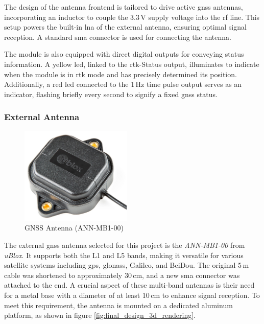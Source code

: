 The design of the antenna frontend is tailored to drive active \acrshort{gnss} antennas, incorporating an inductor to couple the 3.3\,V supply voltage into the \acrshort{rf} line.
This setup powers the built-in \acrshort{lna} of the external antenna, ensuring optimal signal reception.
A standard \acrshort{sma} connector is used for connecting the antenna.

The module is also equipped with direct digital outputs for conveying status information.
A yellow \acrshort{led}, linked to the \acrshort{rtk}-Status output, illuminates to indicate when the module is in \acrshort{rtk} mode and has precisely determined its position.
Additionally, a red \acrshort{led} connected to the 1\,Hz time pulse output serves as an indicator, flashing briefly every second to signify a fixed \acrshort{gnss} status.

\subsubsection{External Antenna}
\begin{minipage}{\linewidth}
	\begin{figure}
		\vspace{-0.2cm}
		\includegraphics[width=5.3cm]{images/6_design_final/gnss_antenna.jpg}
		\centering
		\caption{GNSS Antenna (ANN-MB1-00)}
		\label{fig:gnss_antenna}
	\end{figure}
	The external \acrshort{gnss} antenna selected for this project is the \textit{ANN-MB1-00} from \textit{uBlox}.
	It supports both the L1 and L5 bands, making it versatile for various satellite systems including \acrshort{gps}, \acrshort{glonass}, Galileo, and BeiDou.
	The original 5\,m cable was shortened to approximately 30\,cm, and a new \acrshort{sma} connector was attached to the end.
	A crucial aspect of these multi-band antennas is their need for a metal base with a diameter of at least 10\,cm to enhance signal reception.
	To meet this requirement, the antenna is mounted on a dedicated aluminum platform, as shown in figure \ref{fig:final_design_3d_rendering}.
\end{minipage}
\newpage

